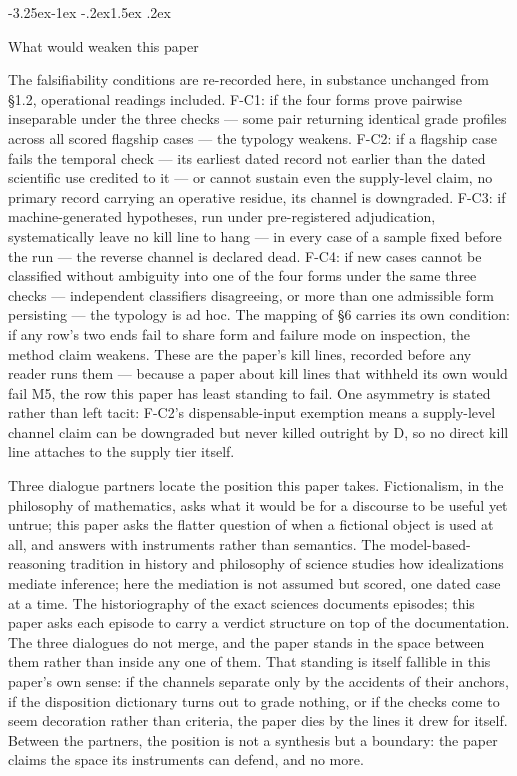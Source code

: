 \documentclass[11pt,a4paper]{article}
\makeatletter
\renewcommand\subsection{\@startsection{subsection}{2}{\z@}%
  {-3.25ex\@plus -1ex \@minus -.2ex}{1.5ex \@plus .2ex}%
  {\normalfont\large\bfseries\raggedright}}
\makeatother
\begin{document}
\subsection{What would weaken this paper}

The falsifiability conditions are re-recorded here, in substance unchanged from §1.2, operational readings included. F-C1: if the four forms prove pairwise inseparable under the three checks — some pair returning identical grade profiles across all scored flagship cases — the typology weakens. F-C2: if a flagship case fails the temporal check — its earliest dated record not earlier than the dated scientific use credited to it — or cannot sustain even the supply-level claim, no primary record carrying an operative residue, its channel is downgraded. F-C3: if machine-generated hypotheses, run under pre-registered adjudication, systematically leave no kill line to hang — in every case of a sample fixed before the run — the reverse channel is declared dead. F-C4: if new cases cannot be classified without ambiguity into one of the four forms under the same three checks — independent classifiers disagreeing, or more than one admissible form persisting — the typology is ad hoc. The mapping of §6 carries its own condition: if any row's two ends fail to share form and failure mode on inspection, the method claim weakens. These are the paper's kill lines, recorded before any reader runs them — because a paper about kill lines that withheld its own would fail M5, the row this paper has least standing to fail. One asymmetry is stated rather than left tacit: F-C2's dispensable-input exemption means a supply-level channel claim can be downgraded but never killed outright by D, so no direct kill line attaches to the supply tier itself.

Three dialogue partners locate the position this paper takes. Fictionalism, in the philosophy of mathematics, asks what it would be for a discourse to be useful yet untrue; this paper asks the flatter question of when a fictional object is used at all, and answers with instruments rather than semantics. The model-based-reasoning tradition in history and philosophy of science studies how idealizations mediate inference; here the mediation is not assumed but scored, one dated case at a time. The historiography of the exact sciences documents episodes; this paper asks each episode to carry a verdict structure on top of the documentation. The three dialogues do not merge, and the paper stands in the space between them rather than inside any one of them. That standing is itself fallible in this paper's own sense: if the channels separate only by the accidents of their anchors, if the disposition dictionary turns out to grade nothing, or if the checks come to seem decoration rather than criteria, the paper dies by the lines it drew for itself. Between the partners, the position is not a synthesis but a boundary: the paper claims the space its instruments can defend, and no more.
\end{document}
